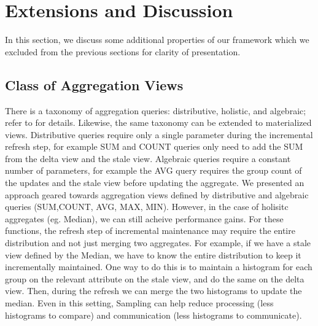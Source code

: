 \section{Extensions and Discussion}
In this section, we discuss some additional properties of our framework which
we excluded from the previous sections for clarity of presentation.

\subsection{Class of Aggregation Views}
There is a taxonomy of aggregation queries: distributive, holistic, and algebraic; refer to \cite{gray1997data} for details.
Likewise, the same taxonomy can be extended to materialized views.
Distributive queries require only a single parameter during the incremental refresh step, for example SUM and COUNT queries only need to
add the SUM from the delta view and the stale view.
Algebraic queries require a constant number of parameters, for example the AVG query requires the group count of the updates and the stale view before updating the aggregate.
We presented an approach geared towards aggregation views defined by distributive and algebraic queries (SUM,COUNT, AVG, MAX, MIN).
However, in the case of holisitc aggregates (eg. Median), we can still acheive performance gains.
For these functions, the refresh step of incremental maintenance may require the entire distribution and not just merging two aggregates.
For example, if we have a stale view defined by the Median, we have to know the entire distribution to keep it incrementally maintained.
One way to do this is to maintain a histogram for each group on the relevant attribute on the stale view, and do the same on the delta view.
Then, during the refresh we can merge the two histograms to update the median.
Even in this setting, Sampling can help reduce processing (less histograms to compare) and communication (less histograms to communicate). 


